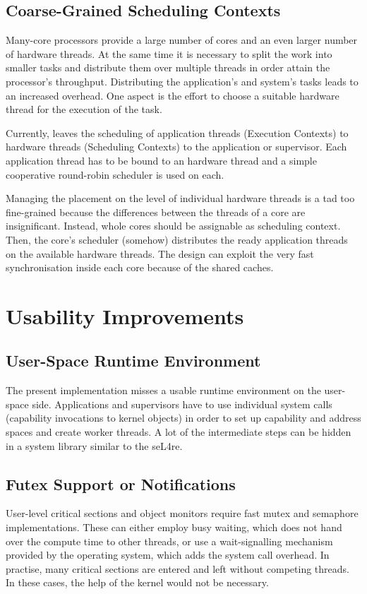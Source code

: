 \subsection{Coarse-Grained Scheduling Contexts}
Many-core processors provide a large number of cores and an even larger number of hardware threads. At the same time it is necessary to split the work into smaller tasks and distribute them over multiple threads in order attain the processor's throughput. Distributing the application's and system's tasks leads to an increased overhead. One aspect is the effort to choose a suitable hardware thread for the execution of the task. 

Currently, \mythos leaves the scheduling of application threads (Execution Contexts) to hardware threads (Scheduling Contexts) to the application or supervisor. Each application thread has to be bound to an hardware thread and a simple cooperative round-robin scheduler is used on each. 

Managing the placement on the level of individual hardware threads is a tad too fine-grained because the differences between the threads of a core are insignificant. Instead, whole cores should be assignable as scheduling context. Then, the core's scheduler (somehow) distributes the ready application threads on the available hardware threads. The design can exploit the very fast synchronisation inside each core because of the shared caches.     


\section{Usability Improvements}
\label{sec:usability}

\subsection{User-Space Runtime Environment}
The present implementation misses a usable runtime environment on the user-space side. Applications and supervisors have to use individual system calls (capability invocations to kernel objects) in order to set up capability and address spaces and create worker threads. A lot of the intermediate steps can be hidden in a system library similar to the seL4re.

\subsection{Futex Support or Notifications}
User-level critical sections and object monitors require fast mutex and semaphore implementations. These can either employ busy waiting, which does not hand over the compute time to other threads, or use a wait-signalling mechanism provided by the operating system, which adds the system call overhead. In practise, many critical sections are entered and left without competing threads. In these cases, the help of the kernel would not be necessary.

